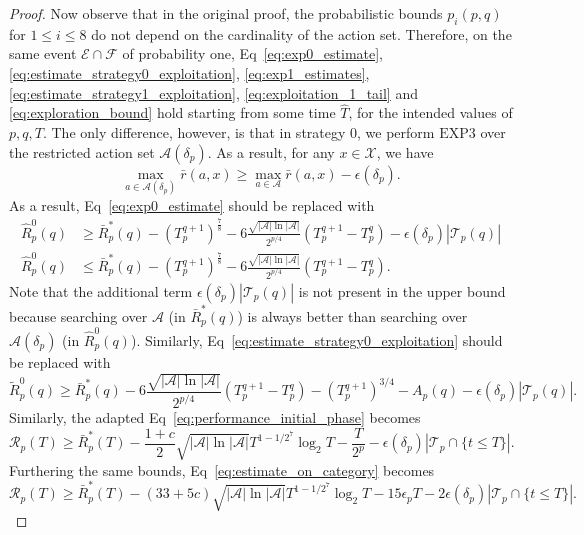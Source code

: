 \documentclass[aos]{imsart}
\theoremstyle{plain}
\theoremstyle{remark}
\newcommand{\Acal}{\mathcal{A}}
\newcommand{\Ecal}{\mathcal{E}}
\newcommand{\Fcal}{\mathcal{F}}
\newcommand{\Rcal}{\mathcal{R}}
\newcommand{\Tcal}{\mathcal{T}}
\newcommand{\Xcal}{\mathcal{X}}
\newcommand{\1}{\mathbbm{1}}%
\newcommand{\EXP}{\mathrm{EXP3}}
\begin{document}
\begin{proof}
Now observe that in the original proof, the probabilistic bounds $p_i(p,q)$ for $1\leq i\leq 8$ do not depend on the cardinality of the action set. Therefore, on the same event $\Ecal\cap\Fcal$ of probability one, Eq~\eqref{eq:exp0_estimate}, \eqref{eq:estimate_strategy0_exploitation}, \eqref{eq:exp1_estimates}, \eqref{eq:estimate_strategy1_exploitation}, \eqref{eq:exploitation_1_tail} and \eqref{eq:exploration_bound} hold starting from some time $\hat T$, for the intended values of $p,q,T$.
The only difference, however, is that in strategy 0, we perform $\EXP$ over the restricted action set $\Acal(\delta_p)$. As a result, for any $x\in\Xcal$, we have
\begin{equation*}
    \max_{a\in\Acal(\delta_p)}\bar r(a, x) \geq \max_{a\in\Acal}\bar r(a, x) - \epsilon(\delta_p).
\end{equation*}
As a result, Eq~\eqref{eq:exp0_estimate} should be replaced with
\begin{align*}
    \hat R_p^0(q) &\geq   \bar R_p^*(q)- (T_p^{q+1})^{\frac{7}{8}} - 6\frac{\sqrt{ |\Acal|\ln |\Acal|}}{2^{p/4}}(T_p^{q+1}-T_p^q) -\epsilon(\delta_p)|\Tcal_p(q)|\\
    \hat R_p^0(q) &\leq   \bar R_p^*(q)- (T_p^{q+1})^{\frac{7}{8}} - 6\frac{\sqrt{ |\Acal|\ln |\Acal|}}{2^{p/4}}(T_p^{q+1}-T_p^q).
\end{align*}
Note that the additional term $\epsilon(\delta_p)|\Tcal_p(q)|$ is not present in the upper bound because searching over $\Acal$ (in $\bar R_p^*(q)$) is always better than searching over $\Acal(\delta_p)$ (in $\hat R_p^0(q)$). Similarly, Eq~\eqref{eq:estimate_strategy0_exploitation} should be replaced with
\begin{equation*}
    \tilde R^0_p(q) \geq \bar R_p^*(q) - 6\frac{\sqrt{ |\Acal|\ln |\Acal|}}{2^{p/4}}(T_p^{q+1}-T_p^q) - (T_p^{q+1})^{3/4} - A_p(q) - \epsilon(\delta_p)|\Tcal_p(q)|.
\end{equation*}
Similarly, the adapted Eq~\eqref{eq:performance_initial_phase} becomes
\begin{equation*}
    \Rcal_p(T) \geq \bar R^*_p(T) -  \frac{1+c}{2}\sqrt{|\Acal|\ln|\Acal|}T^{1-1/2^7}\log_2 T -\frac{T}{2^p}-\epsilon(\delta_p)|\Tcal_p\cap\{t\leq T\}|.
\end{equation*}
Furthering the same bounds, Eq~\eqref{eq:estimate_on_category} becomes
\begin{equation*}
    \Rcal_p(T) \geq \bar R^*_p(T) - (33+5c) \sqrt{|\Acal|\ln|\Acal|}T^{1-1/2^7}\log_2 T - 15\epsilon_pT - 2\epsilon(\delta_p)|\Tcal_p\cap\{t\leq T\}|.
\end{equation*}



\end{proof}
\end{document}
